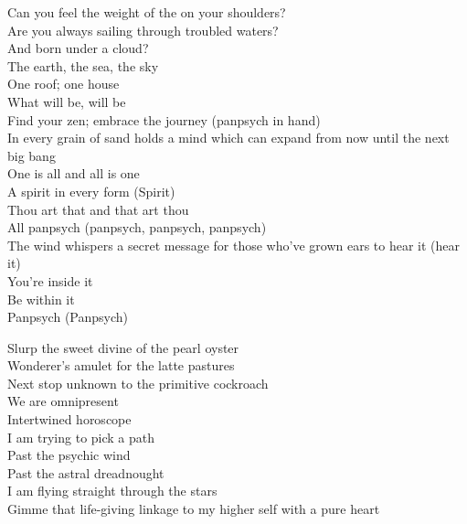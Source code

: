 


Can you feel the weight of the  on your shoulders? \\
Are you always sailing through troubled waters? \\
And born under a cloud? \\
The earth, the sea, the sky \\
One roof; one house \\

What will be, will be \\
Find your zen; embrace the journey (panpsych in hand) \\
In every grain of sand holds a mind which can expand from now until the next big bang \\

One is all and all is one \\
A spirit in every form (Spirit) \\
Thou art that and that art thou \\
All panpsych (panpsych, panpsych, panpsych) \\
The wind whispers a secret message for those who've grown ears to hear it (hear it) \\
You're inside it \\
Be within it \\
Panpsych (Panpsych) \\


Slurp the sweet divine of the pearl oyster \\
Wonderer's amulet for the latte pastures \\
Next stop unknown to the primitive cockroach \\
We are omnipresent \\
Intertwined horoscope \\

I am trying to pick a path \\
Past the psychic wind \\
Past the astral dreadnought \\
I am flying straight through the stars \\
Gimme that life-giving linkage to my higher self with a pure heart \\


